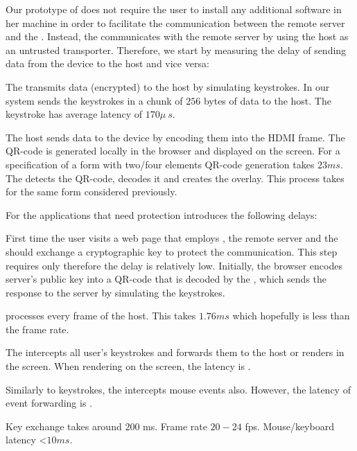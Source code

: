 Our prototype of \name does not require the user to install any additional software in her machine in order to facilitate the communication between the remote server and the \device. Instead, the \device communicates with the remote server by using the host as an untrusted transporter. Therefore, we start by measuring the delay of sending data from the device to the host and vice versa:

 The \device transmits data (encrypted) to the host by simulating keystrokes. In our system \device sends the keystrokes in a chunk of $256$ bytes of data to the host. The keystroke has average latency of $170 \mu\ s$.  

 The host sends data to the device by encoding them into the HDMI frame. The QR-code is generated locally in the browser and displayed on the screen. For a specification of a form with two/four elements QR-code generation takes $23 ms$. The \device detects the QR-code, decodes it and creates the overlay. This process takes  for the same form considered previously.
 
For the applications that need protection \name introduces the following delays:

 First time the user visits a web page that employs \name, the remote server and the \device should exchange a cryptographic key to protect the communication. This step requires only  therefore the delay is relatively low. Initially, the browser encodes server's public key into a QR-code that is decoded by the \device, which sends the response to the server by simulating the keystrokes.

 \device processes every frame of the host. This takes $1.76 ms$ which hopefully is less than the frame rate.

 The \device intercepts all user's keystrokes and forwards them to the host or renders in the screen. When rendering on the screen, the latency is .

 Similarly to keystrokes, the \device intercepts mouse events also. However, the latency of event forwarding is .


Key exchange takes around $200$ ms. Frame rate $20-24$ fps. Mouse/keyboard latency \textless$10ms$.